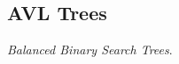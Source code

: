 \documentclass[12pt, letterpaper]{article}
\begin{document}
\begin{multicols*}{3}



        


        



        
        



        
        \section{AVL Trees}
        {\it Balanced Binary Search Trees}.


\end{multicols*}
\end{document}
